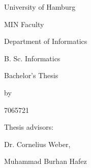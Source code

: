 \begin{titlepage}
    \centering
    University of Hamburg \par
    MIN Faculty \par
    Department of Informatics \par
    B. Sc. Informatics \par
    \vspace{6\baselineskip}
    {\Large Bachelor's Thesis\par}
    {\Huge \thetitle \par}
    \vspace{6\baselineskip}
    by\par
    {\Large \theauthor \par 7065721 \par}
    \vfill
    Thesis advisors:\par
    {\large Dr. Cornelius Weber, \par Muhammad Burhan Hafez}
\end{titlepage}
